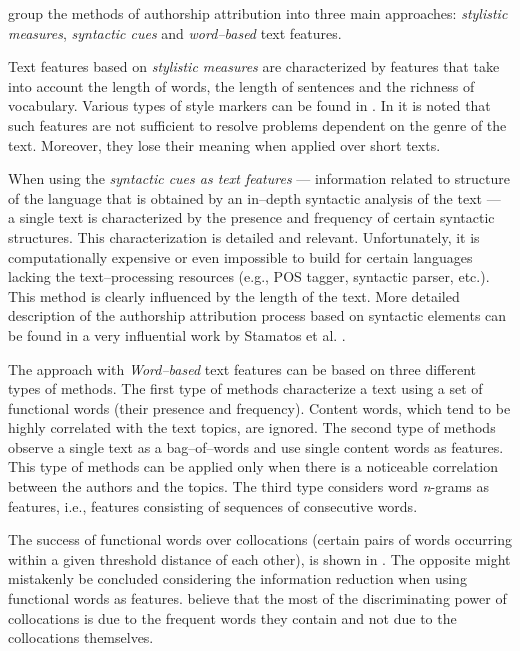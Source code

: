 \documentclass[11pt,english]{article}
\begin{document}
\begin{multicols}{2}
\citet{coyotl2006authorship} group the methods of authorship attribution into three
main approaches: \emph{stylistic measures}, \emph{syntactic cues} and
\emph{word--based} text features.

Text features based on \emph{stylistic measures} are characterized by features that
take into account the length of words, the length of sentences and the richness of vocabulary.
Various types of style markers can be found in
\citep{luyckx2005shallow}. In \citep{coyotl2006authorship} it is noted that such
features are not sufficient to resolve problems dependent on the genre of the
text. Moreover, they lose their meaning when applied over short texts.

When using the \emph{syntactic cues as text features} --- information
related to structure of the language that is obtained by an in--depth syntactic
analysis of the text --- a single text is characterized by the presence and
frequency of certain syntactic structures. This characterization is detailed and relevant.
Unfortunately, it is computationally expensive or even impossible to build for
certain languages lacking the text--processing resources (e.g., POS tagger, syntactic
parser, etc.). This method is clearly influenced by the length of the text. More detailed 
description of the authorship attribution process based on syntactic elements can be found 
in a very influential work by Stamatos et al. \citep{stamatatos2001computer}.

The approach with \emph{Word--based} text features can be based on three
different types of methods. The first type of methods characterize a text
using a set of functional words (their presence and frequency). Content words, which 
tend to be highly correlated with the text topics, are ignored. The second type
of methods observe a single text as a bag--of--words and use single content words as
features. This type of methods can be applied only when there is a noticeable
correlation between the authors and the topics. The third type considers
word \emph{n}-grams as features, i.e., features consisting of sequences of
consecutive words.

The success of functional words over collocations (certain pairs of words
occurring within a given threshold distance of each other), is shown in
\citep{argamon2005measuring}. The opposite might mistakenly be concluded considering
the information reduction when using functional words as features.
\citet{argamon2005measuring} believe that the most of the discriminating power
of collocations is due to the frequent words they contain and not due to the
collocations themselves.


\end{multicols}
\end{document}
